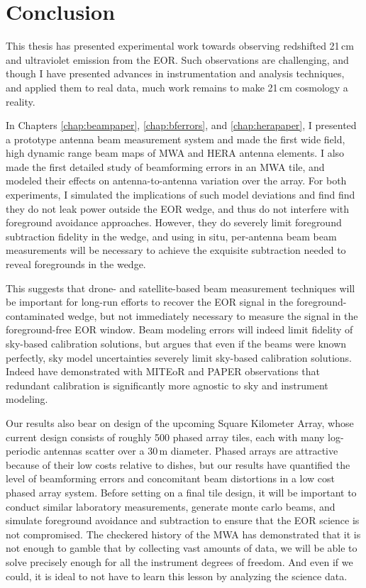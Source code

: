 \chapter{Conclusion}

This thesis has presented experimental work towards observing redshifted 21\,cm and ultraviolet emission from the EOR. Such observations are challenging, and though I have presented advances in instrumentation and analysis techniques, and applied them to real data, much work remains to make 21\,cm cosmology a reality. 
 
In Chapters \ref{chap:beampaper}, \ref{chap:bferrors}, and \ref{chap:herapaper}, I presented a prototype antenna beam measurement system and made the first wide field, high dynamic range beam maps of MWA and HERA antenna elements. I also made the first detailed study of beamforming errors in an MWA tile, and modeled their effects on antenna-to-antenna variation over the array. For both experiments, I simulated the implications of such model deviations and find find they do not leak power outside the EOR wedge, and thus do not interfere with foreground avoidance approaches. However, they do severely limit foreground subtraction fidelity in the wedge, and using in situ, per-antenna beam beam measurements will be necessary to achieve the exquisite subtraction needed to reveal foregrounds in the wedge. 

This suggests that drone- and satellite-based beam measurement techniques will be important for long-run efforts to recover the EOR signal in the foreground-contaminated wedge, but not immediately necessary to measure the signal in the foreground-free EOR window. Beam modeling errors will indeed limit fidelity of sky-based calibration solutions, but \citet{ewallwice16b} argues that even if the beams were known perfectly, sky model uncertainties severely limit sky-based calibration solutions. Indeed \citet{zheng14,ali15} have demonstrated with MITEoR and PAPER observations that redundant calibration is significantly more agnostic to sky and instrument modeling.

Our results also bear on design of the upcoming Square Kilometer Array, whose current design consists of \citep{aavs,aavs2} roughly 500 phased array tiles, each with many log-periodic antennas scatter over a 30\,m diameter. Phased arrays are attractive because of their low costs relative to dishes, but our results have quantified the level of beamforming errors and concomitant beam distortions in a low cost phased array system. Before setting on a final tile design, it will be important to conduct similar laboratory measurements, generate monte carlo beams, and simulate foreground avoidance and subtraction to ensure that the EOR science is not compromised. The checkered history of the MWA has demonstrated that it is not enough to gamble that by collecting vast amounts of data, we will be able to solve precisely enough for all the instrument degrees of freedom. And even if we could, it is ideal to not have to learn this lesson by analyzing the science data.

